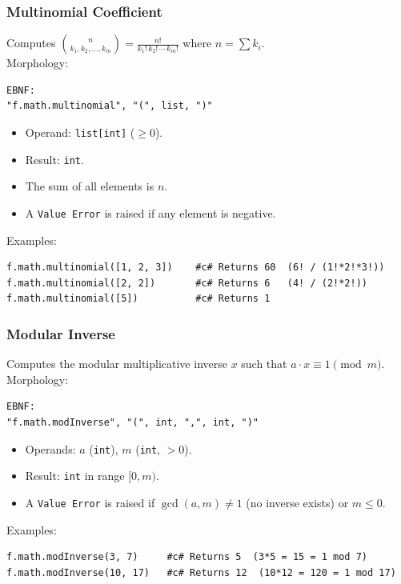 \subsubsection{Multinomial Coefficient}
Computes $\binom{n}{k_1, k_2, \ldots, k_m} = \frac{n!}{k_1!\, k_2!\, \cdots\, k_m!}$ where $n = \sum k_i$. \\
Morphology:
\begin{verbatim}
EBNF:
"f.math.multinomial", "(", list, ")"
\end{verbatim}
\begin{itemize}
\item Operand: \texttt{list[int]} ($\geq 0$).
\item Result: \texttt{int}.
\item The sum of all elements is $n$.
\item A \texttt{Value Error} is raised if any element is negative.
\end{itemize}
Examples:
\begin{verbatim}
f.math.multinomial([1, 2, 3])    #c# Returns 60  (6! / (1!*2!*3!))
f.math.multinomial([2, 2])       #c# Returns 6   (4! / (2!*2!))
f.math.multinomial([5])          #c# Returns 1
\end{verbatim}

\subsubsection{Modular Inverse}
Computes the modular multiplicative inverse $x$ such that $a \cdot x \equiv 1 \pmod{m}$. \\
Morphology:
\begin{verbatim}
EBNF:
"f.math.modInverse", "(", int, ",", int, ")"
\end{verbatim}
\begin{itemize}
\item Operands: $a$ (\texttt{int}), $m$ (\texttt{int}, $> 0$).
\item Result: \texttt{int} in range $[0, m)$.
\item A \texttt{Value Error} is raised if $\gcd(a, m) \neq 1$ (no inverse exists) or $m \leq 0$.
\end{itemize}
Examples:
\begin{verbatim}
f.math.modInverse(3, 7)     #c# Returns 5  (3*5 = 15 = 1 mod 7)
f.math.modInverse(10, 17)   #c# Returns 12  (10*12 = 120 = 1 mod 17)
\end{verbatim}


